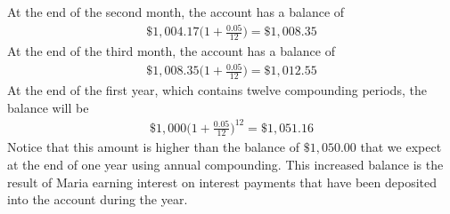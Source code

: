 \documentclass[10pt,]{book}
\theoremstyle{ptxdefinitionnotitle}
\theoremstyle{ptxdefinitiontitle}
\theoremstyle{ptxdefinitionnotitle}
\theoremstyle{ptxdefinitiontitle}
\theoremstyle{ptxdefinitionnotitle}
\theoremstyle{ptxdefinitiontitle}
\numberwithin{equation}{section}
\begin{document}
\hypertarget{p-200}{}%
At the end of the second month, the account has a balance of%
%
\begin{gather*}
\$1,004.17\bigg(1 + \frac{0.05}{12}\bigg) = \$1,008.35
\end{gather*}
\hypertarget{p-201}{}%
At the end of the third month, the account has a balance of%
%
\begin{gather*}
\$1,008.35 \bigg(1 + \frac{0.05}{12}\bigg) = \$1,012.55
\end{gather*}
\hypertarget{p-202}{}%
At the end of the first year, which contains twelve compounding periods, the balance will be%
%
\begin{gather*}
\$1,000 \bigg(1 + \frac{0.05}{12}\bigg)^{12} = \$1,051.16
\end{gather*}
\hypertarget{p-203}{}%
Notice that this amount is higher than the balance of \(\$1,050.00\) that we expect at the end of one year using annual compounding. This increased balance is the result of Maria earning interest on interest payments that have been deposited into the account during the year.%
\end{document}
